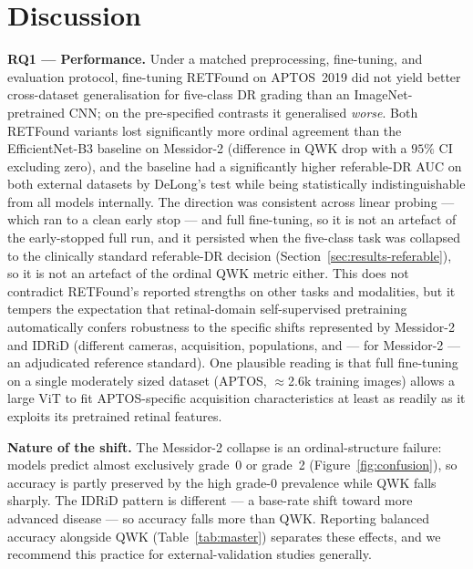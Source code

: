 \documentclass[journal]{IEEEtran}
\renewcommand{\_}{\origunderscore\allowbreak}
\begin{document}
\section{Discussion}
\label{sec:discussion}

\textbf{RQ1 --- Performance.} Under a matched preprocessing, fine-tuning, and
evaluation protocol, fine-tuning RETFound on APTOS~2019 did not yield better
cross-dataset generalisation for five-class DR grading than an ImageNet-pretrained
CNN; on the pre-specified contrasts it generalised \emph{worse}. Both RETFound
variants lost significantly more ordinal agreement than the EfficientNet-B3
baseline on Messidor-2 (difference in QWK drop with a $95\%$ CI excluding zero),
and the baseline had a significantly higher referable-DR AUC on both external
datasets by DeLong's test while being statistically indistinguishable from all
models internally. The direction was consistent across linear probing --- which
ran to a clean early stop --- and full fine-tuning, so it is not an artefact of
the early-stopped full run, and it persisted when the five-class task was
collapsed to the clinically standard referable-DR decision
(Section~\ref{sec:results-referable}), so it is not an artefact of the ordinal
QWK metric either. This does not contradict RETFound's reported strengths
on other tasks and modalities, but it tempers the expectation that retinal-domain
self-supervised pretraining automatically confers robustness to the specific
shifts represented by Messidor-2 and IDRiD (different cameras, acquisition,
populations, and --- for Messidor-2 --- an adjudicated reference standard). One
plausible reading is that full fine-tuning on a single moderately sized dataset
(APTOS, $\approx$2.6k training images) allows a large ViT to fit APTOS-specific
acquisition characteristics at least as readily as it exploits its pretrained
retinal features.

\textbf{Nature of the shift.} The Messidor-2 collapse is an ordinal-structure
failure: models predict almost exclusively grade~0 or grade~2
(Figure~\ref{fig:confusion}), so accuracy is partly preserved by the high grade-0
prevalence while QWK falls sharply. The IDRiD pattern is different --- a base-rate
shift toward more advanced disease --- so accuracy falls more than QWK. Reporting
balanced accuracy alongside QWK (Table~\ref{tab:master}) separates these effects,
and we recommend this practice for external-validation studies generally.
\end{document}
